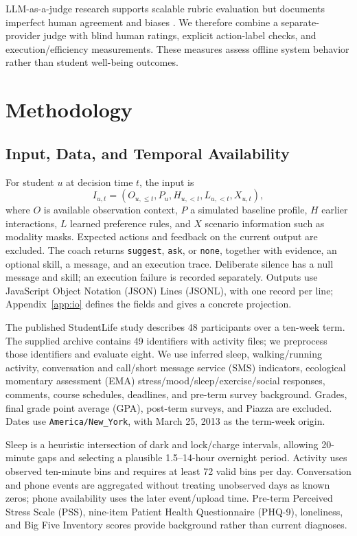 \documentclass{article}
\begin{document}
LLM-as-a-judge research supports scalable rubric evaluation but documents imperfect human agreement and biases \cite{zheng2023judging}. We therefore combine a separate-provider judge with blind human ratings, explicit action-label checks, and execution/efficiency measurements. These measures assess offline system behavior rather than student well-being outcomes.

\section{Methodology}\label{sec:architecture}\label{sec:task}
\subsection{Input, Data, and Temporal Availability}
For student $u$ at decision time $t$, the input is
\begin{equation}
I_{u,t}=(O_{u,\leq t},P_u,H_{u,<t},L_{u,<t},X_{u,t}),
\end{equation}
where $O$ is available observation context, $P$ a simulated baseline profile, $H$ earlier interactions, $L$ learned preference rules, and $X$ scenario information such as modality masks. Expected actions and feedback on the current output are excluded. The coach returns \texttt{suggest}, \texttt{ask}, or \texttt{none}, together with evidence, an optional skill, a message, and an execution trace. Deliberate silence has a null message and skill; an execution failure is recorded separately. Outputs use JavaScript Object Notation (JSON) Lines (JSONL), with one record per line; Appendix~\ref{app:io} defines the fields and gives a concrete projection.

The published StudentLife study describes 48 participants over a ten-week term. The supplied archive contains 49 identifiers with activity files; we preprocess those identifiers and evaluate eight. We use inferred sleep, walking/running activity, conversation and call/short message service (SMS) indicators, ecological momentary assessment (EMA) stress/mood/sleep/exercise/social responses, comments, course schedules, deadlines, and pre-term survey background. Grades, final grade point average (GPA), post-term surveys, and Piazza are excluded. Dates use \texttt{America/New\_York}, with March 25, 2013 as the term-week origin.

Sleep is a heuristic intersection of dark and lock/charge intervals, allowing 20-minute gaps and selecting a plausible 1.5--14-hour overnight period. Activity uses observed ten-minute bins and requires at least 72 valid bins per day. Conversation and phone events are aggregated without treating unobserved days as known zeros; phone availability uses the later event/upload time. Pre-term Perceived Stress Scale (PSS), nine-item Patient Health Questionnaire (PHQ-9), loneliness, and Big Five Inventory scores provide background rather than current diagnoses.
\end{document}
